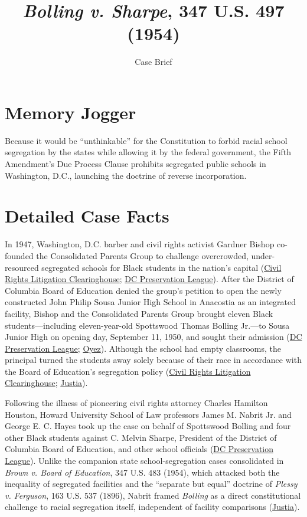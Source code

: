 \documentclass[12pt]{article}
\title{\textit{Bolling v. Sharpe}, 347 U.S. 497 (1954)}
\subtitle{Case Brief}
\author{}
\date{}
\begin{document}
\maketitle

\section{Memory Jogger}

Because it would be ``unthinkable'' for the Constitution to forbid racial school segregation by the states while allowing it by the federal government, the Fifth Amendment's Due Process Clause prohibits segregated public schools in Washington, D.C., launching the doctrine of reverse incorporation.

\section{Detailed Case Facts}

In 1947, Washington, D.C. barber and civil rights activist Gardner Bishop co-founded the Consolidated Parents Group to challenge overcrowded, under-resourced segregated schools for Black students in the nation's capital (\href{https://clearinghouse.net/case/11110/}{Civil Rights Litigation Clearinghouse}; \href{https://historicsites.dcpreservation.org/items/show/969}{DC Preservation League}). After the District of Columbia Board of Education denied the group's petition to open the newly constructed John Philip Sousa Junior High School in Anacostia as an integrated facility, Bishop and the Consolidated Parents Group brought eleven Black students---including eleven-year-old Spottswood Thomas Bolling Jr.---to Sousa Junior High on opening day, September 11, 1950, and sought their admission (\href{https://historicsites.dcpreservation.org/items/show/969}{DC Preservation League}; \href{https://www.oyez.org/cases/1940-1955/347us497}{Oyez}). Although the school had empty classrooms, the principal turned the students away solely because of their race in accordance with the Board of Education's segregation policy (\href{https://clearinghouse.net/case/11110/}{Civil Rights Litigation Clearinghouse}; \href{https://supreme.justia.com/cases/federal/us/347/497/}{Justia}).

Following the illness of pioneering civil rights attorney Charles Hamilton Houston, Howard University School of Law professors James M. Nabrit Jr. and George E. C. Hayes took up the case on behalf of Spottswood Bolling and four other Black students against C. Melvin Sharpe, President of the District of Columbia Board of Education, and other school officials (\href{https://historicsites.dcpreservation.org/items/show/969}{DC Preservation League}). Unlike the companion state school-segregation cases consolidated in \textit{Brown v. Board of Education}, 347 U.S. 483 (1954), which attacked both the inequality of segregated facilities and the ``separate but equal'' doctrine of \textit{Plessy v. Ferguson}, 163 U.S. 537 (1896), Nabrit framed \textit{Bolling} as a direct constitutional challenge to racial segregation itself, independent of facility comparisons (\href{https://supreme.justia.com/cases/federal/us/347/497/}{Justia}).
\end{document}
